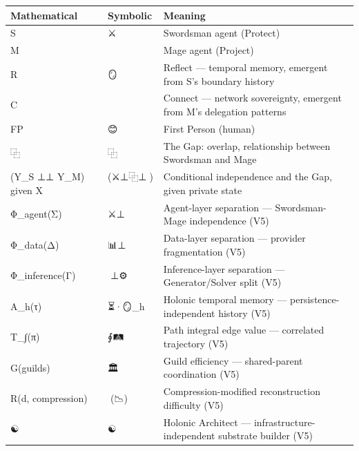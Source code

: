 \documentclass[
]{article}
\newcounter{none} %
\begin{document}
{\def\LTcaptype{none} %
\begin{longtable}[]{@{}
  >{\raggedright\arraybackslash}p{}
  >{\raggedright\arraybackslash}p{}
  >{\raggedright\arraybackslash}p{}@{}}
\toprule\noalign{}
\begin{minipage}[b]{\linewidth}\raggedright
Mathematical
\end{minipage} & \begin{minipage}[b]{\linewidth}\raggedright
Symbolic
\end{minipage} & \begin{minipage}[b]{\linewidth}\raggedright
Meaning
\end{minipage} \\
\midrule\noalign{}
\endhead
\bottomrule\noalign{}
\endlastfoot
S & ⚔️ & Swordsman agent (Protect) \\
M & 🧙 & Mage agent (Project) \\
R & 🪞 & Reflect --- temporal memory, emergent from S's boundary
history \\
C & 🤝 & Connect --- network sovereignty, emergent from M's delegation
patterns \\
FP & 😊 & First Person (human) \\
⿻ & ⿻ & The Gap: overlap, relationship between Swordsman and Mage \\
(Y\_S ⊥⊥ Y\_M) given X & (⚔️⊥⿻⊥🧙)🙂 & Conditional independence and the
Gap, given private state \\
Φ\_agent(Σ) & ⚔️⊥🧙 & Agent-layer separation --- Swordsman-Mage
independence (V5) \\
Φ\_data(Δ) & 📊⊥🔮 & Data-layer separation --- provider fragmentation
(V5) \\
Φ\_inference(Γ) & 🧠⊥⚙️ & Inference-layer separation ---
Generator/Solver split (V5) \\
A\_h(τ) & ⏳·🪞\_h & Holonic temporal memory --- persistence-independent
history (V5) \\
T\_∫(π) & ∮🛤️ & Path integral edge value --- correlated trajectory
(V5) \\
G(guilds) & 🏛️ & Guild efficiency --- shared-parent coordination (V5) \\
R(d, compression) & 🎯(📉) & Compression-modified reconstruction
difficulty (V5) \\
☯️🔷 & ☯️🔷 & Holonic Architect --- infrastructure-independent substrate
builder (V5) \\

\end{longtable}}
\end{document}
